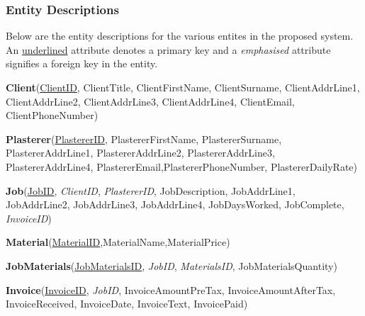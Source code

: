 \subsubsection{Entity Descriptions}

\begin{flushleft}

Below are the entity descriptions for the various entites in the proposed system. An \underline{underlined} attribute denotes a primary key and a \emph{emphasised}	attribute signifies a foreign key in the entity.

\end{flushleft}




\begin{flushleft}
	\textbf{Client}(\underline{ClientID}, ClientTitle, ClientFirstName, ClientSurname, ClientAddrLine1, ClientAddrLine2, ClientAddrLine3, ClientAddrLine4, ClientEmail, ClientPhoneNumber)
\end{flushleft}



\begin{flushleft}
	\textbf{Plasterer}(\underline{PlastererID}, PlastererFirstName, PlastererSurname, PlastererAddrLine1, PlastererAddrLine2, PlastererAddrLine3, PlastererAddrLine4, PlastererEmail,PlastererPhoneNumber, PlastererDailyRate)
\end{flushleft}



\begin{flushleft}
\textbf{Job}(\underline{JobID}, \emph{ClientID}, \emph{PlastererID}, JobDescription, JobAddrLine1, JobAddrLine2, JobAddrLine3, JobAddrLine4, JobDaysWorked,  JobComplete, \emph{InvoiceID})
\end{flushleft}


\begin{flushleft}
\textbf{Material}(\underline{MaterialID},MaterialName,MaterialPrice)
\end{flushleft}


\begin{flushleft}
\textbf{JobMaterials}(\underline{JobMaterialsID}, \emph{JobID}, \emph{MaterialsID}, JobMaterialsQuantity)
\end{flushleft}


\begin{flushleft}
\textbf{Invoice}(\underline{InvoiceID}, \emph{JobID}, InvoiceAmountPreTax, InvoiceAmountAfterTax, InvoiceReceived, InvoiceDate, InvoiceText, InvoicePaid)
\end{flushleft}



